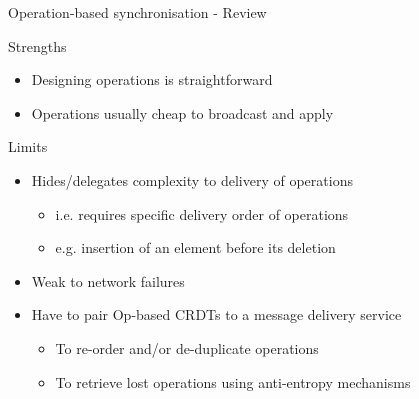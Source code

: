 \begin{frame}{Operation-based synchronisation - Review}

    \begin{block}{Strengths}
        \begin{itemize}
            \item Designing operations is straightforward
            \item Operations usually cheap to broadcast and apply
        \end{itemize}
    \end{block}

    \pause

    \begin{block}{Limits}
        \begin{itemize}
            \item Hides/delegates complexity to delivery of operations
            \begin{itemize}
                \item i.e. requires specific delivery order of operations
                \item e.g. insertion of an element before its deletion
            \end{itemize}
            \pause
            \item Weak to network failures
            \pause
            \item Have to pair Op-based CRDTs to a message delivery service
            \begin{itemize}
                \item To re-order and/or de-duplicate operations
                \item To retrieve lost operations using anti-entropy mechanisms
            \end{itemize}
        \end{itemize}
    \end{block}
\end{frame}